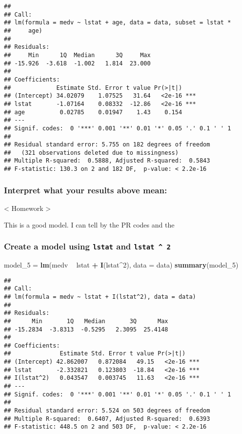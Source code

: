 \documentclass[]{article}
\newenvironment{Shaded}{\begin{snugshade}}{\end{snugshade}}
\newcommand{\DataTypeTok}[1]{\textcolor[rgb]{0.13,0.29,0.53}{#1}}
\newcommand{\DecValTok}[1]{\textcolor[rgb]{0.00,0.00,0.81}{#1}}
\newcommand{\KeywordTok}[1]{\textcolor[rgb]{0.13,0.29,0.53}{\textbf{#1}}}
\newcommand{\NormalTok}[1]{#1}
\newcommand{\OperatorTok}[1]{\textcolor[rgb]{0.81,0.36,0.00}{\textbf{#1}}}
\newcommand{\StringTok}[1]{\textcolor[rgb]{0.31,0.60,0.02}{#1}}
\begin{document}
\begin{verbatim}
## 
## Call:
## lm(formula = medv ~ lstat + age, data = data, subset = lstat * 
##     age)
## 
## Residuals:
##     Min      1Q  Median      3Q     Max 
## -15.926  -3.618  -1.002   1.814  23.000 
## 
## Coefficients:
##             Estimate Std. Error t value Pr(>|t|)    
## (Intercept) 34.02079    1.07525   31.64   <2e-16 ***
## lstat       -1.07164    0.08332  -12.86   <2e-16 ***
## age          0.02785    0.01947    1.43    0.154    
## ---
## Signif. codes:  0 '***' 0.001 '**' 0.01 '*' 0.05 '.' 0.1 ' ' 1
## 
## Residual standard error: 5.755 on 182 degrees of freedom
##   (321 observations deleted due to missingness)
## Multiple R-squared:  0.5888, Adjusted R-squared:  0.5843 
## F-statistic: 130.3 on 2 and 182 DF,  p-value: < 2.2e-16
\end{verbatim}

\hypertarget{interpret-what-your-results-above-mean-4}{%
\subsubsection{Interpret what your results above
mean:}\label{interpret-what-your-results-above-mean-4}}

\textless{} Homework \textgreater{}

This is a good model. I can tell by the PR codes and the

\hypertarget{create-a-model-using-lstat-and-lstat-2}{%
\subsubsection{\texorpdfstring{Create a model using \texttt{lstat} and
\texttt{lstat\ \^{}\ 2}}{Create a model using lstat and lstat \^{} 2}}\label{create-a-model-using-lstat-and-lstat-2}}

\begin{Shaded}
\begin{Highlighting}[]
\NormalTok{model_}\DecValTok{5}\NormalTok{ =}\StringTok{ }\KeywordTok{lm}\NormalTok{(medv }\OperatorTok{~}\StringTok{ }\NormalTok{lstat }\OperatorTok{+}\StringTok{ }\KeywordTok{I}\NormalTok{(lstat}\OperatorTok{^}\DecValTok{2}\NormalTok{), }\DataTypeTok{data =}\NormalTok{ data)}
\KeywordTok{summary}\NormalTok{(model_}\DecValTok{5}\NormalTok{)}
\end{Highlighting}
\end{Shaded}

\begin{verbatim}
## 
## Call:
## lm(formula = medv ~ lstat + I(lstat^2), data = data)
## 
## Residuals:
##      Min       1Q   Median       3Q      Max 
## -15.2834  -3.8313  -0.5295   2.3095  25.4148 
## 
## Coefficients:
##              Estimate Std. Error t value Pr(>|t|)    
## (Intercept) 42.862007   0.872084   49.15   <2e-16 ***
## lstat       -2.332821   0.123803  -18.84   <2e-16 ***
## I(lstat^2)   0.043547   0.003745   11.63   <2e-16 ***
## ---
## Signif. codes:  0 '***' 0.001 '**' 0.01 '*' 0.05 '.' 0.1 ' ' 1
## 
## Residual standard error: 5.524 on 503 degrees of freedom
## Multiple R-squared:  0.6407, Adjusted R-squared:  0.6393 
## F-statistic: 448.5 on 2 and 503 DF,  p-value: < 2.2e-16
\end{verbatim}
\end{document}
